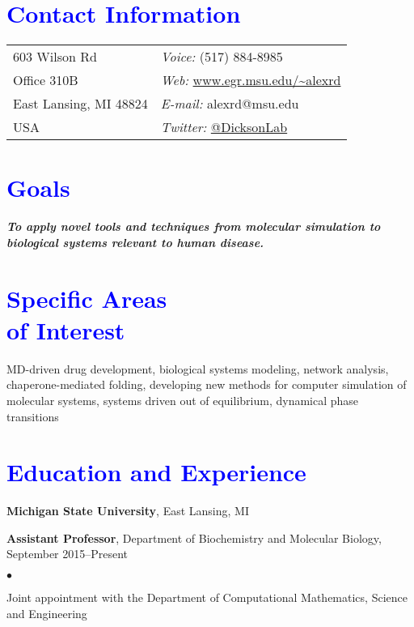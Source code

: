 \documentclass[margin,line]{res}
\newenvironment{list1}{
  \begin{list}{\ding{113}}{%
      \setlength{\itemsep}{0.05in}
      \setlength{\parsep}{0in} \setlength{\parskip}{0in}
      \setlength{\topsep}{0in} \setlength{\partopsep}{0in} 
      \setlength{\leftmargin}{0.17in}}}{\end{list}}
\newenvironment{list2}{
  \begin{list}{$\bullet$}{%
      \setlength{\itemsep}{0.03in}
      \setlength{\parsep}{0in} \setlength{\parskip}{0in}
      \setlength{\topsep}{0.05in} \setlength{\partopsep}{0in} 
      \setlength{\leftmargin}{0.2in}}}{\end{list}}
\begin{document}

\begin{resume}
\section{\sc \textcolor{blue}{Contact Information}}
\vspace{.05in}
\begin{tabular}{@{}p{2in}p{4in}}
603 Wilson Rd             & {\it Voice:}  (517) 884-8985 \\            
Office 310B               & {\it Web:} \url{www.egr.msu.edu/~alexrd} \\         
East Lansing, MI 48824  & {\it E-mail:}  alexrd@msu.edu\\
USA & {\it Twitter:} \url{@DicksonLab}\\
\end{tabular}

\section{\sc \textcolor{blue}{ Goals}}
{\bf{\emph{To apply novel tools and techniques from molecular simulation to biological systems relevant to human disease.}}}

\section{\sc \textcolor{blue}{ Specific Areas \\ of Interest}}
MD-driven drug development, biological systems modeling, network analysis, chaperone-mediated folding,
developing new methods for computer simulation of molecular systems, systems driven out of equilibrium, dynamical phase transitions

\section{\sc \textcolor{blue}{ Education and Experience}}
{\bf Michigan State University}, East Lansing, MI\\
\vspace {-0.05in}
\begin{list1}
\item[] {\bf Assistant Professor}, Department of Biochemistry and Molecular Biology, September 2015--Present
\begin{list2}
\item {Joint appointment with the Department of Computational Mathematics, Science and Engineering}
\end{list2}
\end{list1}


\end{resume}
\end{document}
